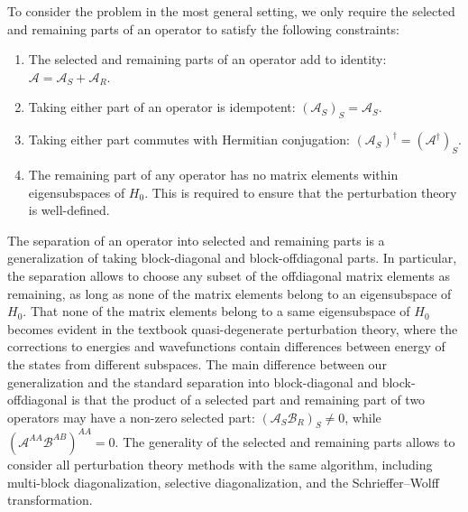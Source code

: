 To consider the problem in the most general setting, we only require the selected and remaining parts of an operator to satisfy the following constraints:
\begin{enumerate}
  \item The selected and remaining parts of an operator add to identity: $\mathcal{A} = \mathcal{A}_{S} + \mathcal{A}_{R}$.
  \item Taking either part of an operator is idempotent: $(\mathcal{A}_{S})_{S} = \mathcal{A}_{S}$.
  \item Taking either part commutes with Hermitian conjugation: $(\mathcal{A}_{S})^\dagger = (\mathcal{A^\dagger})_{S}$.
  \item The remaining part of any operator has no matrix elements within eigensubspaces of $H_0$. This is required to ensure that the perturbation theory is well-defined.
\end{enumerate}
The separation of an operator into selected and remaining parts is a generalization of taking block-diagonal and block-offdiagonal parts.
In particular, the separation allows to choose any subset of the offdiagonal matrix elements as remaining, as long as none of the matrix elements belong to an eigensubspace of $H_0$.
That none of the matrix elements belong to a same eigensubspace of $H_0$ becomes evident in the textbook quasi-degenerate perturbation theory, where the corrections to energies and wavefunctions contain differences between energy of the states from different subspaces.
The main difference between our generalization and the standard separation into block-diagonal and block-offdiagonal is that the product of a selected part and remaining part of two operators may have a non-zero selected part: $(\mathcal{A}_{S}\mathcal{B}_{R})_{S} \neq 0$, while $(\mathcal{A}^{AA}\mathcal{B}^{AB})^{AA} = 0$.
The generality of the selected and remaining parts allows to consider all perturbation theory methods with the same algorithm, including multi-block diagonalization, selective diagonalization, and the Schrieffer--Wolff transformation.

